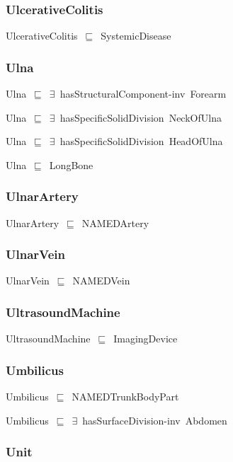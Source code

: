 \documentclass{article}
\begin{document}
\subsubsection*{UlcerativeColitis}

UlcerativeColitis~\ensuremath{\sqsubseteq}~SystemicDisease~

\subsubsection*{Ulna}

Ulna~\ensuremath{\sqsubseteq}~\ensuremath{\exists}~hasStructuralComponent-inv~Forearm~

Ulna~\ensuremath{\sqsubseteq}~\ensuremath{\exists}~hasSpecificSolidDivision~NeckOfUlna~

Ulna~\ensuremath{\sqsubseteq}~\ensuremath{\exists}~hasSpecificSolidDivision~HeadOfUlna~

Ulna~\ensuremath{\sqsubseteq}~LongBone~

\subsubsection*{UlnarArtery}

UlnarArtery~\ensuremath{\sqsubseteq}~NAMEDArtery~

\subsubsection*{UlnarVein}

UlnarVein~\ensuremath{\sqsubseteq}~NAMEDVein~

\subsubsection*{UltrasoundMachine}

UltrasoundMachine~\ensuremath{\sqsubseteq}~ImagingDevice~

\subsubsection*{Umbilicus}

Umbilicus~\ensuremath{\sqsubseteq}~NAMEDTrunkBodyPart~

Umbilicus~\ensuremath{\sqsubseteq}~\ensuremath{\exists}~hasSurfaceDivision-inv~Abdomen~

\subsubsection*{Unit}
\end{document}
